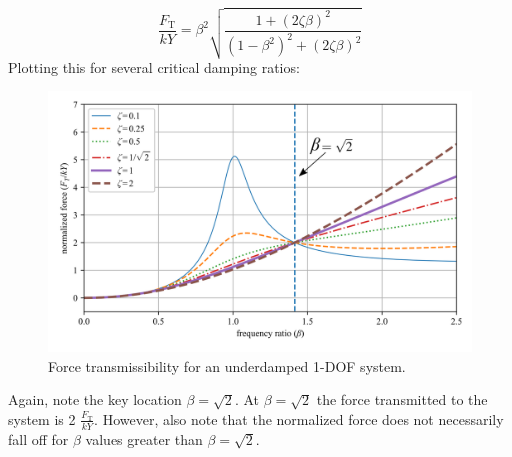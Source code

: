\documentclass[12pt,letter]{article}
\numberwithin{ex}{section} %
\numberwithin{re}{section} %
\numberwithin{pr}{section} %
\begin{document}
				\begin{equation}
					\frac{F_\text{T}}{kY} = \beta^2 \sqrt{\frac{1+(2 \zeta \beta)^2}{(1-\beta^2)^2 + (2 \zeta \beta )^2}} 
				\end{equation}
				Plotting this for several critical damping ratios:
				\begin{figure}[H]
					\centering
					\includegraphics[]{../figures/base_excitation_force_transmissibility.png}
					\caption{Force transmissibility for an underdamped 1-DOF system.}
				\end{figure}
				Again, note the key location $\beta=\sqrt{2}$. At $\beta=\sqrt{2}$ the force transmitted to the system is 2 $\frac{F_\text{T}}{kY}$. However, also note that the normalized force does not necessarily fall off for $\beta$ values greater than $\beta=\sqrt{2}$.  
	
\end{document}
